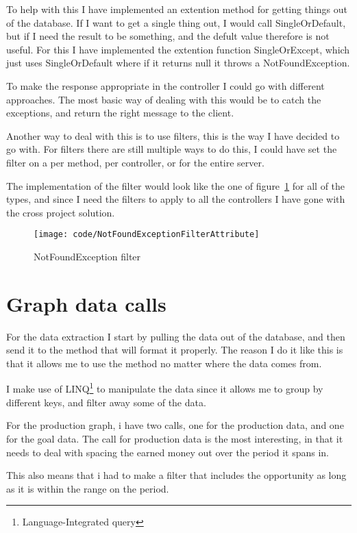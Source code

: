 To help with this I have implemented an extention method for getting things out
of the database. If I want to get a single thing out, I would call
SingleOrDefault, but if I need the result to be something, and the defult value
therefore is not useful. For this I have implemented the extention function
SingleOrExcept, which just uses SingleOrDefault where if it returns null it
throws a NotFoundException.

To make the response appropriate in the controller I could go with different
approaches. The most basic way of dealing with this would be to catch the
exceptions, and return the right message to the client.

Another way to deal with this is to use filters, this is the way I have decided
to go with. For filters there are still multiple ways to do this, I could have
set the filter on a per method, per controller, or for the entire server.

The implementation of the filter would look like the one of
figure~\ref{fig:notfoundfilter} for all of the types, and since I need the
filters to apply to all the controllers I have gone with the cross project
solution. 

\begin{figure}
  \texttt{[image: code/NotFoundExceptionFilterAttribute]}
  \caption{NotFoundException filter}
  \label{fig:notfoundfilter}
\end{figure}

\section{Graph data calls}
\label{sec:Graph data calls}
For the data extraction I start by pulling the data out of the database, and
then send it to the method that will format it properly. The reason I do it like
this is that it allows me to use the method no matter where the data comes from. 

I make use of LINQ\footnote{Language-Integrated query} to manipulate the data
since it allows me to group by different keys, and filter away some of the data.

For the production graph, i have two calls, one for the production data, and one
for the goal data. The call for production data is the most interesting, in that
it needs to deal with spacing the earned money out over the period it spans in.

This also means that i had to make a filter that includes the opportunity as
long as it is within the range on the period.

